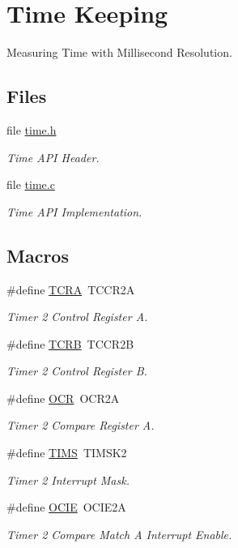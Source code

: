 \hypertarget{group__time}{\section{Time Keeping}
\label{group__time}
}


Measuring Time with Millisecond Resolution.  


\subsection*{Files}
\begin{DoxyCompactItemize}
\item 
file \hyperlink{time_8h}{time.\-h}
\begin{DoxyCompactList}\small\item\em Time A\-P\-I Header. \end{DoxyCompactList}\item 
file \hyperlink{time_8c}{time.\-c}
\begin{DoxyCompactList}\small\item\em Time A\-P\-I Implementation. \end{DoxyCompactList}\end{DoxyCompactItemize}
\subsection*{Macros}
\begin{DoxyCompactItemize}
\item 
\#define \hyperlink{group__time_ga2d2fd1cec45bcf7874da25b8b5efff3c}{T\-C\-R\-A}~T\-C\-C\-R2\-A
\begin{DoxyCompactList}\small\item\em Timer 2 Control Register A. \end{DoxyCompactList}\item 
\#define \hyperlink{group__time_ga717594a5c0d5875c9e22aaa23c0649c5}{T\-C\-R\-B}~T\-C\-C\-R2\-B
\begin{DoxyCompactList}\small\item\em Timer 2 Control Register B. \end{DoxyCompactList}\item 
\#define \hyperlink{group__time_gab38552082013ece744b4bff695e3b039}{O\-C\-R}~O\-C\-R2\-A
\begin{DoxyCompactList}\small\item\em Timer 2 Compare Register A. \end{DoxyCompactList}\item 
\#define \hyperlink{group__time_ga0d40e996ea66a3ab8d42039bebb09978}{T\-I\-M\-S}~T\-I\-M\-S\-K2
\begin{DoxyCompactList}\small\item\em Timer 2 Interrupt Mask. \end{DoxyCompactList}\item 
\#define \hyperlink{group__time_ga28e96a5f5c13f26d2e4e4feae1e3c0fe}{O\-C\-I\-E}~O\-C\-I\-E2\-A
\begin{DoxyCompactList}\small\item\em Timer 2 Compare Match A Interrupt Enable. \end{DoxyCompactList}\end{DoxyCompactItemize}
